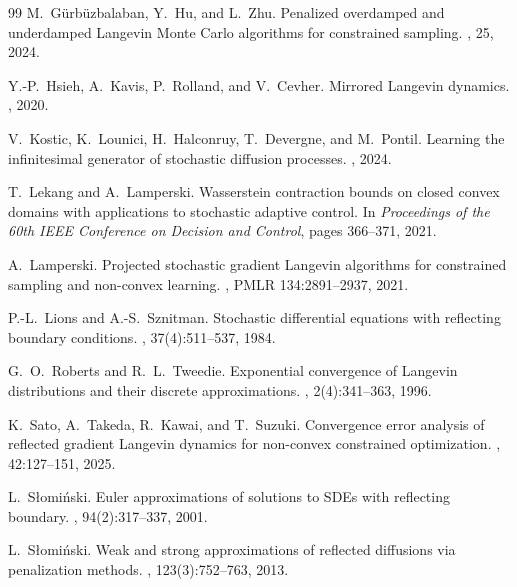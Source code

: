 \documentclass[amsfonts, reqno]{amsart}
\theoremstyle{definition}
\theoremstyle{remark}
\numberwithin{equation}{section}
\begin{document}
\begin{thebibliography}{99}
M.~Gürbüzbalaban, Y.~Hu, and L.~Zhu.
\newblock Penalized overdamped and underdamped Langevin Monte Carlo algorithms for constrained sampling.
, 25, 2024.

Y.-P.~Hsieh, A.~Kavis, P.~Rolland, and V.~Cevher.
\newblock Mirrored Langevin dynamics.
, 2020.

V.~Kostic, K.~Lounici, H.~Halconruy, T.~Devergne, and M.~Pontil.
\newblock Learning the infinitesimal generator of stochastic diffusion processes.
, 2024.

T.~Lekang and A.~Lamperski.
\newblock Wasserstein contraction bounds on closed convex domains with applications to stochastic adaptive control.
\newblock In {\em Proceedings of the 60th IEEE Conference on Decision and Control}, pages 366--371, 2021.

A.~Lamperski.
\newblock Projected stochastic gradient Langevin algorithms for constrained sampling and non-convex learning.
, PMLR 134:2891--2937, 2021.

P.-L.~Lions and A.-S.~Sznitman.
\newblock Stochastic differential equations with reflecting boundary conditions.
, 37(4):511--537, 1984.

G.~O.~Roberts and R.~L.~Tweedie.
\newblock Exponential convergence of Langevin distributions and their discrete approximations.
, 2(4):341--363, 1996.

K.~Sato, A.~Takeda, R.~Kawai, and T.~Suzuki.
\newblock Convergence error analysis of reflected gradient Langevin dynamics for non-convex constrained optimization.
, 42:127--151, 2025.

L.~Słomiński.
\newblock Euler approximations of solutions to SDEs with reflecting boundary.
, 94(2):317--337, 2001.

L.~Słomiński.
\newblock Weak and strong approximations of reflected diffusions via penalization methods.
, 123(3):752--763, 2013.


\end{thebibliography}
\end{document}
